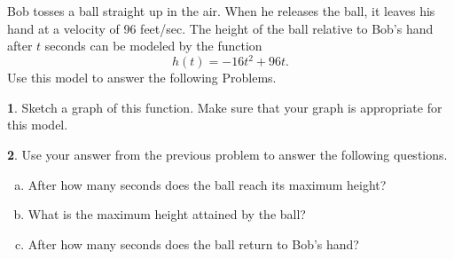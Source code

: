 \documentclass[12pt]{amsart}
\theoremstyle{definition}
\newtheorem{thm}{}
\begin{document}
\newpage
Bob tosses a ball straight up in the air.
When he releases the ball, it leaves his hand at a velocity of 96 feet/sec.
The height of the ball relative to Bob's hand after $t$ seconds can be modeled by the function
$$h(t) = -16t^2 + 96t.$$
Use this model to answer the following Problems.
\begin{thm}\label{problem: kinematics graph}
  Sketch a graph of this function.
  Make sure that your graph is appropriate for this model.
\end{thm}

\newpage

\begin{thm}\label{problem: maximum}
  Use your answer from the previous problem to answer the following questions.
  \begin{enumerate}[(a)]
  \item
    After how many seconds does the ball reach its maximum height?
    \vspace{2in}
  \item
    What is the maximum height attained by the ball?
    \vspace{2in}
  \item
    After how many seconds does the ball return to Bob's hand?
  \end{enumerate}
\end{thm}
\end{document}

